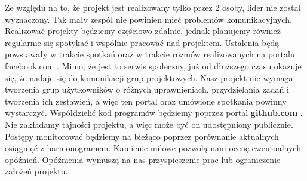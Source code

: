 Ze względu na to, że projekt jest realizowany tylko przez 2 osoby, lider nie został wyznaczony. Tak mały zespół nie powinien mieć problemów komunikacyjnych. Realizować projekty będziemy częściowo zdalnie, jednak planujemy również regularnie się spotykać i wspólnie pracować nad projektem. Ustalenia będą powstawały w trakcie spotkań oraz w trakcie rozmów realizowanych na portalu facebook.com . Mimo, że jest to serwis społeczny, już od dłuższego czasu okazuje się, że nadaje się do komunikacji grup projektowych. Nasz projekt nie wymaga tworzenia grup użytkowników o różnych uprawnieniach, przydzielania zadań i tworzenia ich zestawień, a więc ten portal oraz umówione spotkania powinny wystarczyć. \newline
Współdzielić kod programów będziemy poprzez portal \textbf{github.com} . Nie zakładamy tajności projektu, a więc może być on udostępniony publicznie. \newline
Postępy monitorować będziemy na bieżąco poprzez porównanie aktualnych osiągnięć z harmonogramem. Kamienie milowe pozwolą nam ocenę ewentualnych opóźnień. Opóźnienia wymuszą na nas przyspieszenie prac lub ograniczenie założeń projektu.
\textsl{}
